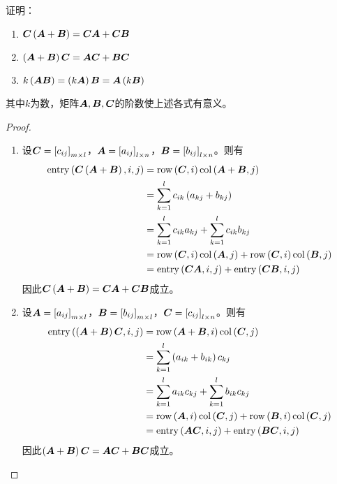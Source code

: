 \begin{extraprob}
    证明：
    \begin{enumerate}
        \item \(\matc\mypar{\mata+\matb}=\matc\mata+\matc\matb\)
        \item \(\mypar{\mata+\matb}\matc=\mata\matc+\matb\matc\)
        \item \(k\mypar{\mata\matb}=\mypar{k\mata}\matb=\mata\mypar{k\matb}\)
    \end{enumerate}
    其中\(k\)为数，矩阵\(\mata,\matb,\matc\)的阶数使上述各式有意义。
\end{extraprob}
\begin{proof}
    \begin{enumerate}
        \item
              {
              设\(\matc=\mat{c_{ij}}_{m\times l}\)，\(\mata=\mat{a_{ij}}_{l\times n}\)，\(\matb=\mat{b_{ij}}_{l\times n}\)。则有
              \begin{align*}
                  \entry{\matc\mypar{\mata+\matb}}{i}{j} & =\row{\matc}{i}\col{\mata+\matb}{j}                        \\
                                                         & =\sum_{k=1}^lc_{ik}\mypar{a_{kj}+b_{kj}}                   \\
                                                         & =\sum_{k=1}^lc_{ik}a_{kj}+\sum_{k=1}^lc_{ik}b_{kj}         \\
                                                         & =\row{\matc}{i}\col{\mata}{j}+\row{\matc}{i}\col{\matb}{j} \\
                                                         & =\entry{\matc\mata}{i}{j}+\entry{\matc\matb}{i}{j}
              \end{align*}
              因此\(\matc\mypar{\mata+\matb}=\matc\mata+\matc\matb\)成立。
              }

        \item
              {
              设\(\mata=\mat{a_{ij}}_{m\times l}\)，\(\matb=\mat{b_{ij}}_{m\times l}\)，\(\matc=\mat{c_{ij}}_{l\times n}\)。则有
              \begin{align*}
                  \entry{\mypar{\mata+\matb}\matc}{i}{j} & =\row{\mata+\matb}{i}\col{\matc}{j}                        \\
                                                         & =\sum_{k=1}^l\mypar{a_{ik}+b_{ik}}c_{kj}                   \\
                                                         & =\sum_{k=1}^la_{ik}c_{kj}+\sum_{k=1}^lb_{ik}c_{kj}         \\
                                                         & =\row{\mata}{i}\col{\matc}{j}+\row{\matb}{i}\col{\matc}{j} \\
                                                         & =\entry{\mata\matc}{i}{j}+\entry{\matb\matc}{i}{j}
              \end{align*}
              因此\(\mypar{\mata+\matb}\matc=\mata\matc+\matb\matc\)成立。
              }


\end{enumerate}
\end{proof}
